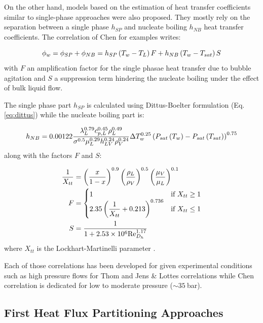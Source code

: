\npar

On the other hand, models based on the estimation of heat transfer coefficients similar to single-phase approaches were also proposed. They mostly rely on the separation between a single phase $h_{SP}$ and nucleate boiling $h_{NB}$ heat transfer coefficients. The correlation of Chen \cite{chen_correl} for examples writes:

\begin{equation}
\phi_{w} = \phi_{SP} + \phi_{NB} = h_{SP}\left( T_{w}-T_{L} \right)F + h_{NB}\left( T_{w}-T_{sat} \right)S
\end{equation}
with $F$ an amplification factor for the single phasae heat transfer due to bubble agitation and $S$ a suppression term hindering the nucleate boiling under the effect of bulk liquid flow.

The single phase part $h_{SP}$ is calculated using Dittus-Boelter \cite{dittus_heat_1985} formulation (Eq. \ref{eq:dittus}) while the nucleate boiling part is:

\begin{equation}
h_{NB} = 0.00122 \frac{\lambda_{L}^{0.79} c_{p,L}^{0.45} \rho_{L}^{0.49}}{\sigma^{0.5} \mu_{L}^{0.29} h_{LV}^{0.24}\rho_{V}^{0.24}} \Delta T_{w}^{0.25} \left( P_{sat}\left( T_{w} \right) - P_{sat}\left( T_{sat} \right) \right)^{0.75}
\end{equation}
along with the factors $F$ and $S$:

\begin{align}
\frac{1}{X_{tt}} & = \parth{\frac{x}{1-x}}^{0.9} \parth{\frac{\rho_{L}}{\rho_{V}}}^{0.5} \parth{\frac{\mu_{V}}{\mu_{L}}}^{0.1} \\
F &= 
\begin{cases}
1\ &\text{if}\ X_{tt}\geq 1\\
2.35 \parth{\dfrac{1}{X_{tt}} + 0.213}^{0.736} &\text{if}\ X_{tt}\leq 1
\end{cases}
\\
%
S &= \dfrac{1}{1+ 2.53\times 10^{6} \Re_{D_{h}}^{1.17}}
\end{align}
where $X_{tt}$ is the Lockhart-Martinelli parameter \cite{lockhart_martinelli}.

\npar

Each of those correlations has been developed for given experimental conditions such as high pressure flows for Thom and Jens \& Lottes correlations while Chen correlation is dedicated for low to moderate pressure ($\sim 35\ $bar).

\subsection{First Heat Flux Partitioning Approaches}

